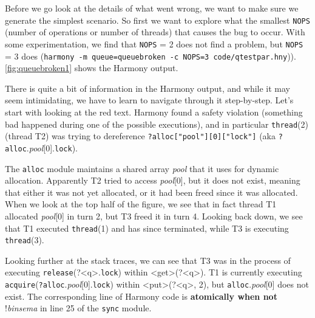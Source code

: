 \documentclass{report}
\begin{document}
Before we go look at the details of what went wrong, we want to make
sure we generate the simplest scenario.  So first we want to explore
what the smallest \texttt{NOPS} (number of operations or number of
threads) that causes the bug to occur.  With some experimentation,
we find that \texttt{NOPS} = 2 does not find a problem, but
\texttt{NOPS} = 3 does
(\texttt{harmony -m queue=queuebroken -c NOPS=3 code/qtestpar.hny})).
\autoref{fig:queuebroken1} shows the Harmony output.

There is quite a bit of information in the Harmony output, and while
it may seem intimidating, we have to learn to navigate through it
step-by-step.
Let's start with looking at the red text.  Harmony found a safety
violation (something bad happened during one of the possible executions),
and in particular \texttt{thread}(2) (thread T2) was trying to dereference
\texttt{?alloc["pool"][0]["lock"]}
(aka \texttt{?alloc}.\textit{pool}[0].\texttt{lock}).

The \texttt{alloc} module maintains a shared array \textit{pool} that
it uses for dynamic allocation.  Apparently T2 tried to access
\textit{pool}[0], but it does not exist, meaning that either it was not
yet allocated, or it had been freed since it was allocated.
When we look at the top half of the figure, we see that in fact thread
T1 allocated \textit{pool}[0] in turn 2, but T3 freed it in turn 4.
Looking back down, we see that T1 executed \texttt{thread}(1) and has
since terminated, while T3 is executing \texttt{thread}(3).

Looking further at the stack traces, we can see that
T3 was in the process of executing
\texttt{release}(?<{q}>.\texttt{lock}) within
<{get}>(?<{q}>).
T1 is currently executing
\texttt{acquire}(\texttt{?alloc}.\textit{pool}[0].\texttt{lock})
within <{put}>(?<{q}>, 2), but 
\texttt{alloc}.\textit{pool}[0] does not exist.
The corresponding line of Harmony code is
\textbf{atomically when not} !\textit{binsema}
in line 25 of the \texttt{sync} module.
\end{document}
